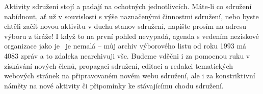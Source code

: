 Aktivity sdružení stojí a padají na ochotných jednotlivcích.  Máte-li co sdružení nabídnout, ať už v souvislosti s výše naznačenými činnostmi sdružení, nebo byste chtěli začít novou aktivitu v duchu stanov sdružení, napište prosím na adresu výboru z tiráže!  I když to na první pohled nevypadá, agenda s vedením neziskové organizace jako je \CSTUG\ je nemalá -- můj archiv výborového listu od roku 1993 má 4083 zpráv a to zdaleka nearchivuji vše.
Budeme vděčni i za pomocnou ruku v získávání nových členů, propagaci sdružení, editaci a redakci tematických webových stránek na připravovaném novém webu sdružení, ale i za konstriktivní náměty na nové aktivity či připomínky ke stávajícímu chodu sdružení.
